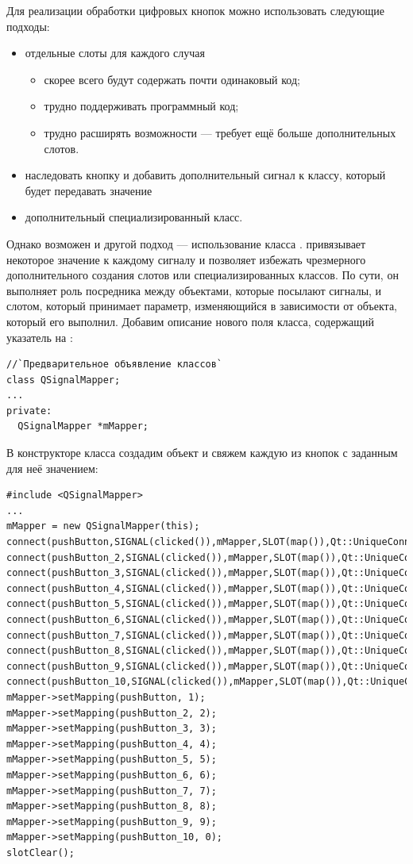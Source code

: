 Для реализации обработки цифровых кнопок можно использовать следующие подходы:

\begin{itemize}
\item отдельные слоты для каждого случая
\begin{itemize}
\item скорее всего будут содержать почти одинаковый код;
\item трудно поддерживать программный код;
\item трудно расширять возможности --- требует ещё больше дополнительных слотов.
\end{itemize}
\item наследовать кнопку и добавить дополнительный сигнал к классу, который будет передавать значение 
\item дополнительный специализированный класс.
\end{itemize}

Однако возможен и другой подход --- использование класса .
 привязывает некоторое значение к каждому сигналу и позволяет избежать
чрезмерного дополнительного создания слотов или специализированных классов. По сути, он выполняет роль посредника между
объектами, которые посылают сигналы, и слотом, который принимает параметр, изменяющийся в зависимости от объекта,
который его выполнил. Добавим описание нового поля класса, содержащий указатель на :
\begin{lstlisting}
//`Предварительное объявление классов`
class QSignalMapper;
...
private:
  QSignalMapper *mMapper;
\end{lstlisting}

В конструкторе класса создадим объект и свяжем каждую из кнопок с заданным для неё значением:
\begin{lstlisting}
#include <QSignalMapper>
...
mMapper = new QSignalMapper(this);
connect(pushButton,SIGNAL(clicked()),mMapper,SLOT(map()),Qt::UniqueConnection);
connect(pushButton_2,SIGNAL(clicked()),mMapper,SLOT(map()),Qt::UniqueConnection);
connect(pushButton_3,SIGNAL(clicked()),mMapper,SLOT(map()),Qt::UniqueConnection);
connect(pushButton_4,SIGNAL(clicked()),mMapper,SLOT(map()),Qt::UniqueConnection);
connect(pushButton_5,SIGNAL(clicked()),mMapper,SLOT(map()),Qt::UniqueConnection);
connect(pushButton_6,SIGNAL(clicked()),mMapper,SLOT(map()),Qt::UniqueConnection);
connect(pushButton_7,SIGNAL(clicked()),mMapper,SLOT(map()),Qt::UniqueConnection);
connect(pushButton_8,SIGNAL(clicked()),mMapper,SLOT(map()),Qt::UniqueConnection);
connect(pushButton_9,SIGNAL(clicked()),mMapper,SLOT(map()),Qt::UniqueConnection);
connect(pushButton_10,SIGNAL(clicked()),mMapper,SLOT(map()),Qt::UniqueConnection);
mMapper->setMapping(pushButton, 1);
mMapper->setMapping(pushButton_2, 2);
mMapper->setMapping(pushButton_3, 3);
mMapper->setMapping(pushButton_4, 4);
mMapper->setMapping(pushButton_5, 5);
mMapper->setMapping(pushButton_6, 6);
mMapper->setMapping(pushButton_7, 7);
mMapper->setMapping(pushButton_8, 8);
mMapper->setMapping(pushButton_9, 9);
mMapper->setMapping(pushButton_10, 0);
slotClear();
\end{lstlisting}

